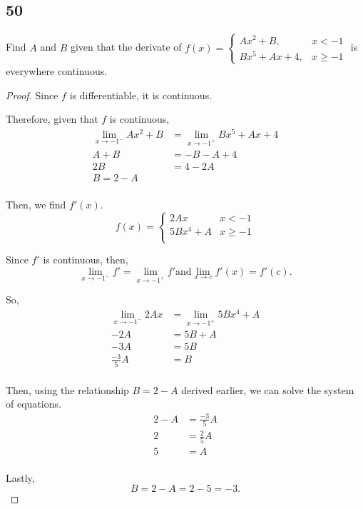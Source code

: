 \documentclass[../hw3.tex]{subfiles}
\begin{document}
\subsection*{50}
Find $A$ and $B$ given that the derivate of $f(x) = \begin{cases}
    Ax^2+B, & x<-1 \\
    Bx^5+Ax+4, & x\geq-1
\end{cases}$ is everywhere continuous.

\begin{proof}
    Since $f$ is differentiable, it is continuous.

    Therefore, given that $f$ is continuous,
    \begin{align*}
        \lim\limits_{x \to -1^-} Ax^2+B &= \lim\limits_{x \to -1^+} Bx^5+Ax+4 \\
        A+B &= -B-A+4 \\
        2B &= 4-2A \\
        B = 2-A \\
    \end{align*}

    Then, we find $f'(x)$.
    \[f(x) = \begin{cases}
        2Ax & x<-1 \\
        5Bx^4 + A & x\geq-1 \\
    \end{cases}\]

    Since $f'$ is continuous, then, \[\lim\limits_{x \to -1^-} f' = \lim\limits_{x \to -1^+} f' \text{and} \lim\limits_{x \to c} f'(x) = f'(c). \]

    So,
    \begin{align*}
        \lim\limits_{x \to -1^-} 2Ax &= \lim\limits_{x \to -1^+} 5Bx^4+A \\
        -2A &= 5B+A \\
        -3A &= 5B \\
        \frac{-3}{5}A &= B \\
    \end{align*}

    Then, using the relationship $B=2-A$ derived earlier, we can solve the system of equations.
    \begin{align*}
        2-A &= \frac{-3}{5}A \\
        2 &= \frac{2}{5}A \\
        5 &= A \\
    \end{align*}

    Lastly, \[B=2-A=2-5=-3.\]

\end{proof}
\end{document}

